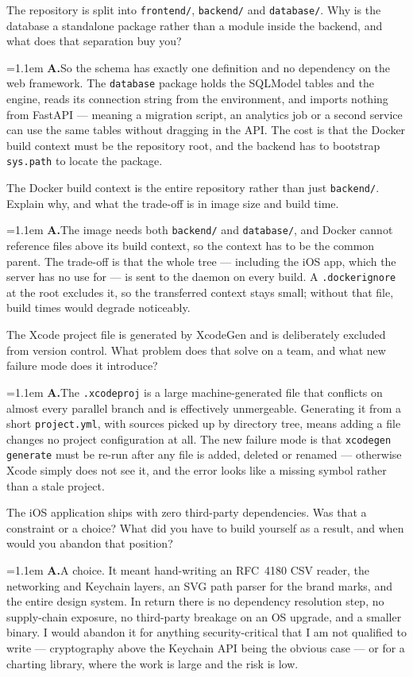 \documentclass[11pt,a4paper]{article}
\newcommand{\code}[1]{\texttt{\small #1}}
\newcommand{\ans}[1]{%
  \par\vspace{0.32em}%
  \begingroup
  \small\color{answerink}%
  \leftskip=1.1em
  \noindent\textbf{\color{accent}A.}\hspace{0.45em}#1\par
  \endgroup
  \vspace{0.1em}%
}
\begin{document}
\begin{questions}

\item The repository is split into \code{frontend/}, \code{backend/} and
\code{database/}. Why is the database a standalone package rather than a module
inside the backend, and what does that separation buy you?
\ans{So the schema has exactly one definition and no dependency on the web
framework. The \code{database} package holds the SQLModel tables and the engine,
reads its connection string from the environment, and imports nothing from
FastAPI --- meaning a migration script, an analytics job or a second service can
use the same tables without dragging in the API. The cost is that the Docker
build context must be the repository root, and the backend has to bootstrap
\code{sys.path} to locate the package.}

\item The Docker build context is the entire repository rather than just
\code{backend/}. Explain why, and what the trade-off is in image size and build
time.
\ans{The image needs both \code{backend/} and \code{database/}, and Docker cannot
reference files above its build context, so the context has to be the common
parent. The trade-off is that the whole tree --- including the iOS app, which the
server has no use for --- is sent to the daemon on every build. A
\code{.dockerignore} at the root excludes it, so the transferred context stays
small; without that file, build times would degrade noticeably.}

\item The Xcode project file is generated by XcodeGen and is deliberately
excluded from version control. What problem does that solve on a team, and what
new failure mode does it introduce?
\ans{The \code{.xcodeproj} is a large machine-generated file that conflicts on
almost every parallel branch and is effectively unmergeable. Generating it from a
short \code{project.yml}, with sources picked up by directory tree, means adding a
file changes no project configuration at all. The new failure mode is that
\code{xcodegen generate} must be re-run after any file is added, deleted or
renamed --- otherwise Xcode simply does not see it, and the error looks like a
missing symbol rather than a stale project.}

\item The iOS application ships with zero third-party dependencies. Was that a
constraint or a choice? What did you have to build yourself as a result, and when
would you abandon that position?
\ans{A choice. It meant hand-writing an RFC~4180 CSV reader, the networking and
Keychain layers, an SVG path parser for the brand marks, and the entire design
system. In return there is no dependency resolution step, no supply-chain
exposure, no third-party breakage on an OS upgrade, and a smaller binary. I would
abandon it for anything security-critical that I am not qualified to write ---
cryptography above the Keychain API being the obvious case --- or for a charting
library, where the work is large and the risk is low.}


\end{questions}
\end{document}
